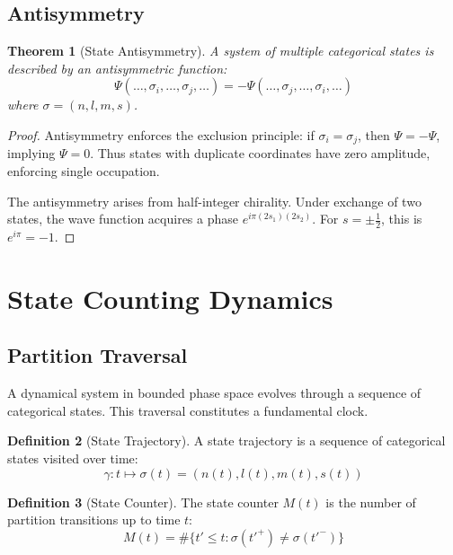 \documentclass[twocolumn,10pt,a4paper]{article}
\newtheorem{theorem}{Theorem}[section]
\theoremstyle{definition}
\newtheorem{definition}[theorem]{Definition}
\theoremstyle{remark}
\begin{document}
\subsection{Antisymmetry}

\begin{theorem}[State Antisymmetry]
\label{thm:antisymmetry}
A system of multiple categorical states is described by an antisymmetric function:
\begin{equation}
    \Psi(\ldots, \sigma_i, \ldots, \sigma_j, \ldots) = -\Psi(\ldots, \sigma_j, \ldots, \sigma_i, \ldots)
\end{equation}
where $\sigma = (n, l, m, s)$.
\end{theorem}

\begin{proof}
Antisymmetry enforces the exclusion principle: if $\sigma_i = \sigma_j$, then $\Psi = -\Psi$, implying $\Psi = 0$. Thus states with duplicate coordinates have zero amplitude, enforcing single occupation.

The antisymmetry arises from half-integer chirality. Under exchange of two states, the wave function acquires a phase $e^{i\pi(2s_1)(2s_2)}$. For $s = \pm\frac{1}{2}$, this is $e^{i\pi} = -1$.
\end{proof}

\section{State Counting Dynamics}
\label{sec:counting}

\subsection{Partition Traversal}

A dynamical system in bounded phase space evolves through a sequence of categorical states. This traversal constitutes a fundamental clock.

\begin{definition}[State Trajectory]
A state trajectory is a sequence of categorical states visited over time:
\begin{equation}
    \gamma: t \mapsto \sigma(t) = (n(t), l(t), m(t), s(t))
\end{equation}
\end{definition}

\begin{definition}[State Counter]
The state counter $M(t)$ is the number of partition transitions up to time $t$:
\begin{equation}
    M(t) = \#\{t' \leq t : \sigma(t'^+) \neq \sigma(t'^-)\}
\end{equation}
\end{definition}
\end{document}
